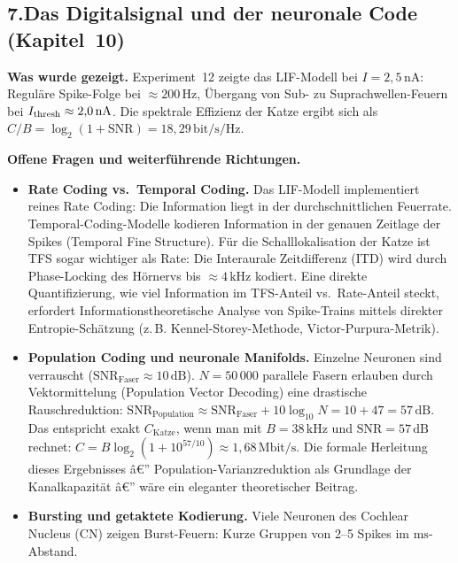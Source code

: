﻿\documentclass[12pt,a4paper,titlepage]{report}
\begin{document}
\subsection*{7.\enspace Das Digitalsignal und der neuronale Code
(Kapitel~10)}

\textbf{Was wurde gezeigt.}
Experiment~12 zeigte das LIF-Modell bei $I=2{,}5\,\mathrm{nA}$:
Reguläre Spike-Folge bei $\approx 200\,\mathrm{Hz}$,
Übergang von Sub- zu Suprachwellen-Feuern bei $I_{\rm thresh} \approx 2{,}0\,\mathrm{nA}$.
Die spektrale Effizienz der Katze ergibt sich als
$C/B = \log_2(1+\mathrm{SNR}) = 18{,}29\,\mathrm{bit/s/Hz}$.

\textbf{Offene Fragen und weiterführende Richtungen.}
\begin{itemize}[leftmargin=2em]
  \item \textbf{Rate Coding vs.\ Temporal Coding.}
    Das LIF-Modell implementiert reines Rate Coding:
    Die Information liegt in der durchschnittlichen Feuerrate.
    Temporal-Coding-Modelle kodieren Information in der genauen
    Zeitlage der Spikes (Temporal Fine Structure).
    Für die Schalllokalisation der Katze ist TFS sogar wichtiger als
    Rate: Die Interaurale Zeitdifferenz (ITD) wird durch
    Phase-Locking des Hörnervs bis $\approx 4\,\mathrm{kHz}$ kodiert.
    Eine direkte Quantifizierung, wie viel Information im TFS-Anteil
    vs.\ Rate-Anteil steckt, erfordert Informationstheoretische
    Analyse von Spike-Trains mittels direkter Entropie-Schätzung
    (z.\,B. Kennel-Storey-Methode, Victor-Purpura-Metrik).
  \item \textbf{Population Coding und neuronale Manifolds.}
    Einzelne Neuronen sind verrauscht ($\mathrm{SNR}_\text{Faser} \approx 10\,\mathrm{dB}$).
    $N=50\,000$ parallele Fasern erlauben durch Vektormittelung
    (Population Vector Decoding) eine drastische Rauschreduktion:
    $\mathrm{SNR}_\text{Population} \approx \mathrm{SNR}_\text{Faser} + 10\log_{10}N
    = 10 + 47 = 57\,\mathrm{dB}$.
    Das entspricht exakt $C_\mathrm{Katze}$, wenn man mit
    $B=38\,\mathrm{kHz}$ und $\mathrm{SNR}=57\,\mathrm{dB}$ rechnet:
    $C = B\log_2(1+10^{57/10}) \approx 1{,}68\,\mathrm{Mbit/s}$.
    Die formale Herleitung dieses Ergebnisses â€” Population-Varianzreduktion
    als Grundlage der Kanalkapazität â€” wäre ein eleganter
    theoretischer Beitrag.
  \item \textbf{Bursting und getaktete Kodierung.}
    Viele Neuronen des Cochlear Nucleus (CN) zeigen Burst-Feuern:
    Kurze Gruppen von 2--5 Spikes im $\mathrm{ms}$-Abstand.

\end{itemize}
\end{document}
